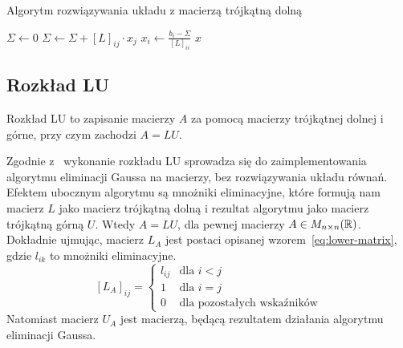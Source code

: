 \documentclass[../main.tex]{subfiles}
\begin{document}
    \begin{algorithm}
      \caption{Algorytm rozwiązywania układu z macierzą trójkątną dolną}
      \label{alg:lt-matrix}
      \begin{algorithmic}[1]
            \State $\Sigma \gets 0$
              \State $\Sigma \gets \Sigma + [L]_{ij} \cdot x_j$
            \EndFor
            \State $x_i \gets \frac{b_i - \Sigma}{[L]_{ii}}$
          \EndFor
          \State \Return $x$
        \EndProcedure
      \end{algorithmic}
    \end{algorithm}

    \subsection{Rozkład LU}
    Rozkład LU to zapisanie macierzy \( A \) za pomocą macierzy trójkątnej dolnej
    i górne, przy czym zachodzi \( A = LU \).

    Zgodnie z~\cite{kielb92} wykonanie rozkładu LU sprowadza się 
    do zaimplementowania algorytmu eliminacji Gaussa
    na macierzy, bez rozwiązywania układu równań. Efektem ubocznym algorytmu są mnożniki
    eliminacyjne, które formują nam macierz \( L \) jako macierz trójkątną dolną
    i rezultat algorytmu jako macierz trójkątną górną \( U \). Wtedy \( A = LU \),
    dla pewnej macierzy \( A \in M_{n \times n}(\mathbb{R}) \). Dokładnie ujmując, macierz
    \( L_A \) jest postaci opisanej wzorem~\ref{eq:lower-matrix}, gdzie \( l_{ik} \)
    to mnożniki eliminacyjne.
    \begin{equation} \label{eq:lower-matrix}
      [L_A]_{ij} = \begin{cases}
        l_{ij} & \text{dla $i < j$} \\
        1 & \text{dla $i = j$} \\
        0 & \text{dla pozostałych wskaźników}
      \end{cases}
    \end{equation}
    Natomiast macierz \( U_A \) jest macierzą, będącą rezultatem działania algorytmu
    eliminacji Gaussa.
\end{document}
